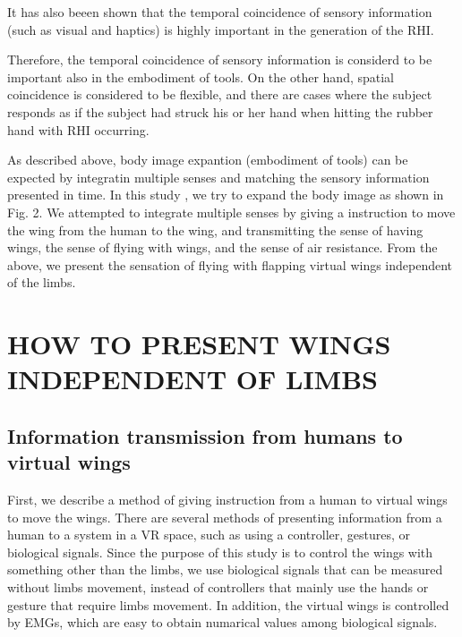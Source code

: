 \documentclass[letterpaper, 10 pt, conference]{ieeeconf}  %
\begin{document}
                It has also beeen shown that the temporal coincidence of sensory information (such as visual and haptics) is highly important in the generation of the RHI\cite{ehrsson2007experimental}.  
                
                Therefore, the temporal coincidence of sensory information is considerd to be important also in the embodiment of tools.  
                On the other hand, spatial coincidence is considered to be flexible, and there are cases where the subject responds as if the subject had struck his or her hand when hitting the rubber hand with RHI occurring\cite{armel2003projecting}.  


                As described above, body image expantion (embodiment of tools) can be expected by integratin multiple senses and matching the sensory information presented in time.  
                In this study , we try to expand the body image as shown in Fig. 2.  
                We attempted to integrate multiple senses by giving a instruction to move the wing from the human to the wing, and transmitting the sense of having wings, the sense of flying with wings, and the sense of air resistance.  
                From the above, we present the sensation of flying with flapping virtual wings independent of the limbs.

\section{HOW TO PRESENT WINGS INDEPENDENT OF LIMBS}
        \subsection{Information transmission from humans to virtual wings}
                First, we describe a method of giving instruction from a human to virtual wings to move the wings.
                There are several methods of presenting information from a human to a system in a VR space, such as using a controller, gestures, or biological signals.
                Since the purpose of this study is to control the wings with something other than the limbs, we use biological signals that can be measured without limbs movement, instead of controllers that mainly use the hands or gesture that require limbs movement.
                In addition, the virtual  wings is controlled by EMGs, which are easy to obtain numarical values among biological signals.
\end{document}
